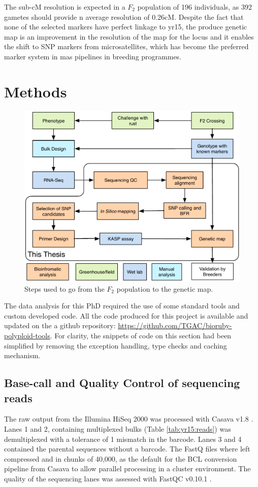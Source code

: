 The sub-cM resolution is expected in a $F_{2}$ population of 196 individuals, as 392 gametes should provide n average resolution of 0.26{}cM. 
Despite the fact that none of the selected markers have perfect linkage to \acrshort{yr15}, the produce genetic map is an improvement in the resolution of the map for the locus and it enables the shift to SNP markers from microsatellites, which has become the preferred marker system in \acrshort{mas} pipelines in breeding programmes. 


\section{Methods}
\label{yr15:methods}

\begin{figure}
\includegraphics[width=1\textwidth]{Yr15/Figures/pipeline.pdf}
\caption{Steps used to go from the $F_{2}$ population to the genetic map.}
\end{figure}

The data analysis for this PhD required the use of some standard tools and custom developed code. 
All the code produced for this project is available and updated on the a github repository: \url{https://github.com/TGAC/bioruby-polyploid-tools}. 
For clarity, the snippets of code on this section had been simplified by removing the exception handling, type checks and caching mechanism.

\subsection{Base-call and Quality Control of sequencing reads}
The raw output from the Illumina HiSeq 2000 was processed with Casava v1.8 \citep{casavaBCL}. 
Lanes 1 and 2, containing multiplexed bulks (Table \ref{tab:yr15:reads}) was demultiplexed with a tolerance of 1 mismatch in the barcode. 
Lanes 3 and 4 contained the parental sequences without a barcode. 
The FastQ files where left compressed and in chunks of 40,000, as the default for the BCL conversion pipeline from Casava to allow parallel processing in a cluster environment. 
The quality of the sequencing lanes was assessed with FastQC v0.10.1 \citep{fastqc}. 

